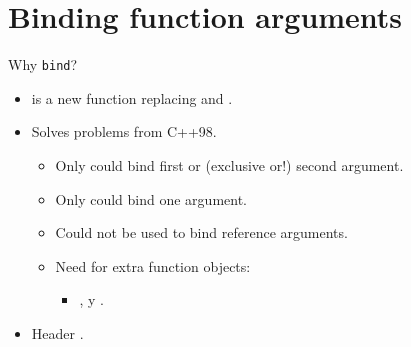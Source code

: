 \section{Binding function arguments}

\begin{frame}[t]{Why \texttt{bind}?}
  \begin{itemize}
    \item {} is a new function replacing
           and .

    \item Solves problems from C++98.
      \begin{itemize}
        \item Only could bind first or (exclusive or!) second argument.
        \item Only could bind one argument.
        \item Could not be used to bind reference arguments.
        \item Need for extra function objects:
          \begin{itemize}
            \item {},  y .
          \end{itemize}
      \end{itemize}

    \item Header .
  \end{itemize}
\end{frame}

